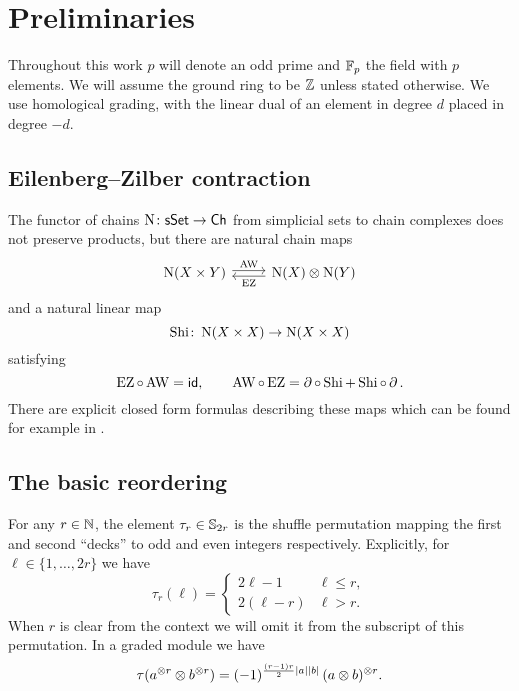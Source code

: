 
\section{Preliminaries}

Throughout this work $p$ will denote an odd prime and ${\mathbb{F}_p}$ the field with $p$ elements.
We will assume the ground ring to be $\mathbb{Z}$ unless stated otherwise.
We use homological grading, with the linear dual of an element in degree $d$ placed in degree $-d$.

\subsection{Eilenberg--Zilber contraction}

The functor of chains $\operatorname{N} \colon \mathsf{sSet} \to \mathsf{Ch}$ from simplicial sets to chain complexes does not preserve products, but there are natural chain maps
\[
\begin{tikzcd}
	\chains(X \times Y) \arrow[r,shift left=2pt,"\AW"] &
	\chains(X) \ot \chains(Y) \arrow[l,shift left=2pt,"\EZ"]
\end{tikzcd}
\]
and a natural linear map
\[
\operatorname{Shi} \colon \operatorname{N}(X \times X) \to \operatorname{N}(X \times X)
\]
satisfying
\[
\operatorname{EZ} \circ \operatorname{AW} = \mathsf{id}, \qquad
\operatorname{AW} \circ \operatorname{EZ} = \operatorname{\partial} \circ \operatorname{Shi} + \operatorname{Shi} \circ \operatorname{\partial}.
\]
There are explicit closed form formulas describing these maps which can be found for example in \cite[56]{real2000homological}.

\subsection{The basic reordering}\label{ss:reordering}

For any $r\in\mathbb{N}$, the element $\tau_r \in \mathbb{S}_{2r}$ is the shuffle permutation mapping the first and second ``decks'' to odd and even integers respectively.
Explicitly, for $\ell \in \{1,\dots,2r\}$ we have
\begin{equation*}
	\tau_r(\ell) =
	\begin{cases}
		2\ell-1 & \ell \leq r, \\
		2(\ell-r) & \ell > r.
	\end{cases}
\end{equation*}
When $r$ is clear from the context we will omit it from the subscript of this permutation.
In a graded module we have
\[
\tau(a^{\otimes r} \otimes b^{\otimes r}) =
(-1)^{\frac{(r-1)r}{2}\lvert a\rvert\lvert b\rvert} \, (a \otimes b)^{\otimes r}.
\]